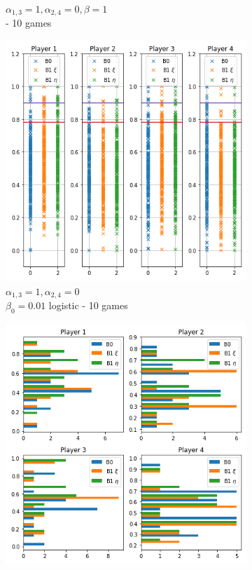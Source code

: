 \begin{figure}[!hb]
\begin{subfigure}{0.3\textwidth}
	    \caption{$\alpha_{1,3}=1,\alpha_{2,4}=0,\beta=1$ \\ - 10 games}
	    \label{fig:31}
    \end{subfigure}%
	\begin{subfigure}{0.3\textwidth}
	    \centering
	    \includegraphics[width=1\linewidth]{Bilder/exp3.png}
	    \caption{$\alpha_{1,3}=1,\alpha_{2,4}=0$ \\ $\beta_0=0.01$ logistic - 10 games}
	    \label{fig:32}
	\end{subfigure}
	\begin{subfigure}{.3\textwidth}
    	\centering
    	\includegraphics[width=1\linewidth]{Bilder/exp1_2.png}

\end{subfigure}
\end{figure}
